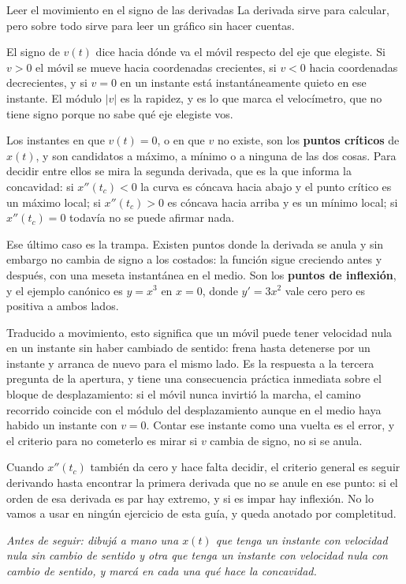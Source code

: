 \documentclass[11pt,openany]{book}
\begin{document}
\begin{bloque}{Leer el movimiento en el signo de las derivadas}
La derivada sirve para calcular, pero sobre todo sirve para leer un gráfico sin hacer cuentas.

El signo de $v(t)$ dice hacia dónde va el móvil respecto del eje que elegiste. Si $v>0$ el móvil se mueve hacia coordenadas crecientes, si $v<0$ hacia coordenadas decrecientes, y si $v=0$ en un instante está instantáneamente quieto en ese instante. El módulo $\lvert v\rvert$ es la rapidez, y es lo que marca el velocímetro, que no tiene signo porque no sabe qué eje elegiste vos.

Los instantes en que $v(t)=0$, o en que $v$ no existe, son los \textbf{puntos críticos} de $x(t)$, y son candidatos a máximo, a mínimo o a ninguna de las dos cosas. Para decidir entre ellos se mira la segunda derivada, que es la que informa la concavidad: si $x''(t_c)<0$ la curva es cóncava hacia abajo y el punto crítico es un máximo local; si $x''(t_c)>0$ es cóncava hacia arriba y es un mínimo local; si $x''(t_c)=0$ todavía no se puede afirmar nada.

Ese último caso es la trampa. Existen puntos donde la derivada se anula y sin embargo no cambia de signo a los costados: la función sigue creciendo antes y después, con una meseta instantánea en el medio. Son los \textbf{puntos de inflexión}, y el ejemplo canónico es $y=x^3$ en $x=0$, donde $y'=3x^2$ vale cero pero es positiva a ambos lados.

Traducido a movimiento, esto significa que un móvil puede tener velocidad nula en un instante sin haber cambiado de sentido: frena hasta detenerse por un instante y arranca de nuevo para el mismo lado. Es la respuesta a la tercera pregunta de la apertura, y tiene una consecuencia práctica inmediata sobre el bloque de desplazamiento: si el móvil nunca invirtió la marcha, el camino recorrido coincide con el módulo del desplazamiento aunque en el medio haya habido un instante con $v=0$. Contar ese instante como una vuelta es el error, y el criterio para no cometerlo es mirar si $v$ cambia de signo, no si se anula.

Cuando $x''(t_c)$ también da cero y hace falta decidir, el criterio general es seguir derivando hasta encontrar la primera derivada que no se anule en ese punto: si el orden de esa derivada es par hay extremo, y si es impar hay inflexión. No lo vamos a usar en ningún ejercicio de esta guía, y queda anotado por completitud.

\textit{Antes de seguir: dibujá a mano una $x(t)$ que tenga un instante con velocidad nula sin cambio de sentido y otra que tenga un instante con velocidad nula con cambio de sentido, y marcá en cada una qué hace la concavidad.}


\end{bloque}
\end{document}

